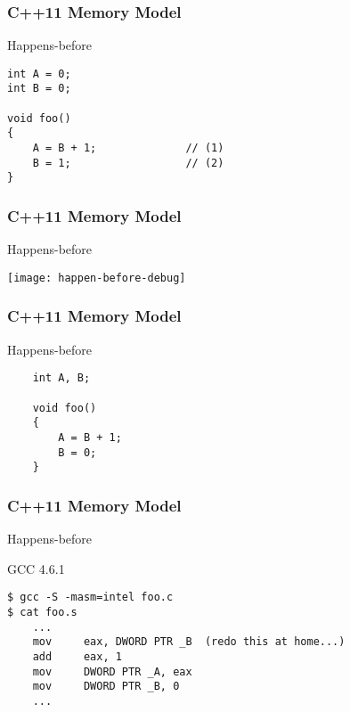 \begin{frame}[fragile]
    \frametitle{C++11 Memory Model}
    \LARGE
    Happens-before
    \large    
    \begin{block}{}
        \begin{verbatim}
int A = 0;
int B = 0;

void foo()
{
    A = B + 1;              // (1)
    B = 1;                  // (2)
}
\end{verbatim}
    \end{block}
    
\end{frame}

\begin{frame}[fragile]
    \frametitle{C++11 Memory Model}
    \LARGE
    Happens-before
    
        \centering    
   \texttt{[image: happen-before-debug]}
    
\end{frame}
\begin{frame}[fragile]
    \frametitle{C++11 Memory Model}
    \LARGE
     Happens-before
\large    
    \begin{block}{}
        \begin{verbatim}
    int A, B;
    
    void foo()
    {
        A = B + 1;
        B = 0;
    }
\end{verbatim}
    \end{block}
    
\end{frame}


\begin{frame}[fragile]
    \frametitle{C++11 Memory Model}
    \LARGE
    Happens-before
    \large    
    
    GCC 4.6.1
    \begin{block}{}
        \begin{verbatim}
$ gcc -S -masm=intel foo.c
$ cat foo.s
    ...
    mov     eax, DWORD PTR _B  (redo this at home...)
    add     eax, 1
    mov     DWORD PTR _A, eax
    mov     DWORD PTR _B, 0
    ...
        \end{verbatim}
    \end{block}
    
\end{frame}

